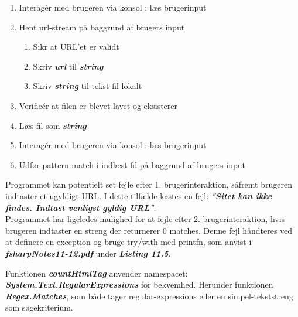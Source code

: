 \documentclass[a4paper,10pt]{article}
\begin{document}
\begin{enumerate}
\item Interagér med brugeren via konsol : læs brugerinput
\item Hent url-stream på baggrund af brugers input
\begin{enumerate}
\item Sikr at URL'et er validt
\item Skriv \textbf{\textit{url}} til \textbf{\textit{string}}
\item Skriv \textbf{\textit{string}} til tekst-fil lokalt
\end{enumerate}
\item Verificér at filen er blevet lavet og eksisterer
\item Læs fil som \textbf{\textit{string}}
\item Interagér med brugeren via konsol : læs brugerinput
\item Udfør pattern match i indlæst fil på baggrund af brugers input
\end{enumerate}

\noindent Programmet kan potentielt set fejle efter 1. brugerinteraktion, såfremt brugeren indtaster et ugyldigt URL. I dette tilfælde kastes en fejl: \textbf{\textit{"Sitet kan ikke findes. Indtast venligst gyldig URL"}}. \\

\noindent Programmet har ligeledes mulighed for at fejle efter 2. brugerinteraktion, hvis brugeren indtaster en streng der returnerer 0 matches. Denne fejl håndteres ved at definere en exception og bruge try/with med printfn, som anvist i \textbf{\textit{fsharpNotes11-12.pdf}} under \textbf{\textit{Listing 11.5}}. \newline

\noindent Funktionen \textbf{\textit{countHtmlTag}} anvender namespacet: \textbf{\textit{System.Text.RegularExpressions}} for bekvemhed. Herunder funktionen \textbf{\textit{Regex.Matches}}, som både tager regular-expressions eller en simpel-tekststreng som søgekriterium. 
\end{document}
